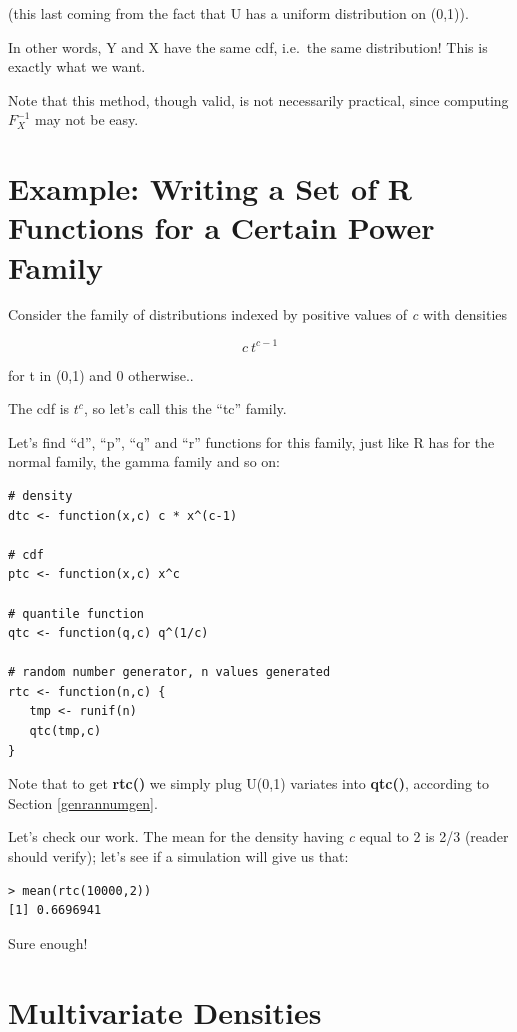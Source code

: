 (this last coming from the fact that U has a uniform distribution on
(0,1)).

In other words, Y and X have the same cdf, i.e.\ the same distribution!
This is exactly what we want.

Note that this method, though valid, is not necessarily practical, since
computing $F_X^{-1}$ may not be easy.

\section{Example:  Writing a Set of R Functions for a Certain Power Family}

Consider the family of distributions indexed by positive values of
{\it c} with densities

\begin{equation}
c ~ t^{c-1}
\end{equation}

for t in (0,1) and 0 otherwise..

The cdf is $t^c$, so let's call this the ``tc'' family.

Let's find ``d'', ``p'', ``q'' and ``r'' functions for this family, just
like R has for the normal family, the gamma family and so on:

\begin{lstlisting}
# density
dtc <- function(x,c) c * x^(c-1)

# cdf
ptc <- function(x,c) x^c

# quantile function
qtc <- function(q,c) q^(1/c)

# random number generator, n values generated
rtc <- function(n,c) {
   tmp <- runif(n)
   qtc(tmp,c)
}
\end{lstlisting}

Note that to get {\bf rtc()} we simply plug U(0,1) variates into {\bf
qtc()}, according to Section \ref{genrannumgen}.

Let's check our work.  The mean for the density having {\it c} equal to
2 is 2/3 (reader should verify); let's see if a simulation will give us
that:

\begin{lstlisting}
> mean(rtc(10000,2))
[1] 0.6696941
\end{lstlisting}

Sure enough!

\section{Multivariate Densities}
\label{minimulcontin}

